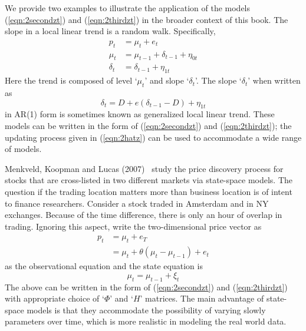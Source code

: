 We provide two examples to illustrate the application of the models (\ref{eqn:2secondzt}) and (\ref{eqn:2thirdzt}) in the broader context of this book. The slope in a local linear trend is a random walk. Specifically,
	\begin{equation}\label{eqn:randomwalk}
	\begin{split}
	p_t&= \mu_t+ e_t \\
	\mu_t&= \mu_{t-1} + \delta_{t-1} + \eta_{0t} \\
	\delta_t&=\delta_{t-1}+\eta_{1t}
	\end{split}
	\end{equation}
Here the trend is composed of level `$\mu_t$' and slope `$\delta_t$'. The slope `$\delta_t$' when written as 
	\begin{equation}\label{eqn:slopewritten}
	\delta_t= D+ e(\delta_{t-1} - D)+ \eta_{1t}
	\end{equation}
in AR(1) form is sometimes known as generalized local linear trend. These models can be written in the form of (\ref{eqn:2secondzt}) and (\ref{eqn:2thirdzt}); the updating process given in (\ref{eqn:2hatz}) can be used to accommodate a wide range of models.


Menkveld, Koopman and Lucas (2007)~\cite{menkkoop} study the price discovery process for stocks that are cross-listed in two different markets via state-space models. The question if the trading location matters more than business location is of intent to finance researchers. Consider a stock traded in Amsterdam and in NY exchanges. Because of the time difference, there is only an hour of overlap in trading. Ignoring this aspect, write the two-dimensional price vector as
	\begin{equation}
	\begin{split}
	p_t&=\mu_t + e_T \\
	&=\mu_t + \theta(\mu_t-\mu_{t-1}) + e_t
	\end{split}
	\end{equation}
as the observational equation and the state equation is
	\begin{equation}
	\mu_t= \mu_{t-1} + \xi_t
	\end{equation}
The above can be written in the form of (\ref{eqn:2secondzt}) and (\ref{eqn:2thirdzt}) with appropriate choice of `$\Phi$' and `$H$' matrices. The main advantage of state-space models is that they accommodate the possibility of varying slowly parameters over time, which is more realistic in modeling the real world data. 


